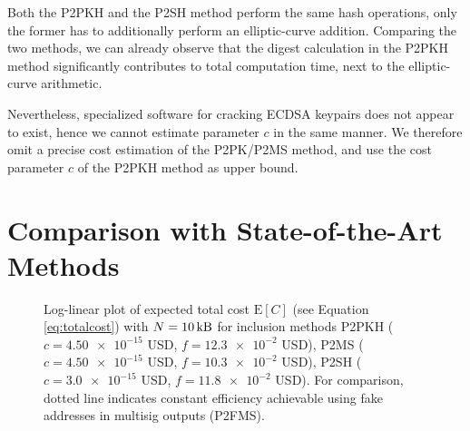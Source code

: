 \documentclass[a4paper,11pt,titlepage]{scrbook}
\begin{document}
Both the P2PKH and the P2SH method perform the same hash operations, only the former has to additionally perform an elliptic-curve addition.
Comparing the two methods, we can already observe that the digest calculation in the P2PKH method significantly contributes to total computation time, next to the elliptic-curve arithmetic.

Nevertheless, specialized software for cracking ECDSA keypairs does not appear to exist, hence we cannot estimate parameter $c$ in the same manner.
We therefore omit a precise cost estimation of the P2PK/P2MS method, and use the cost parameter $c$ of the P2PKH method as upper bound.

\section{Comparison with State-of-the-Art Methods}\label{sec:comparison}

\begin{figure}[tb]
    \centering
    \caption[Log-linear plot of expected total cost]{Log-linear plot of expected total cost $\mathrm{E}[C]$ (see Equation \ref{eq:totalcost}) with $N=\protect\SI{10}{\kilo\byte}$ for inclusion methods P2PKH ($c=\num{4.50e-15}$ USD, $f=\num{12.3e-2}$ USD), P2MS ($c=\num{4.50e-15}$ USD, $f=\num{10.3e-2}$ USD), P2SH ($c=\num{3.0e-15}$ USD, $f=\num{11.8e-2}$ USD). For comparison, dotted line indicates constant efficiency achievable using fake addresses in multisig outputs (P2FMS).}
    \label{fig:plot}
\end{figure}
\end{document}
